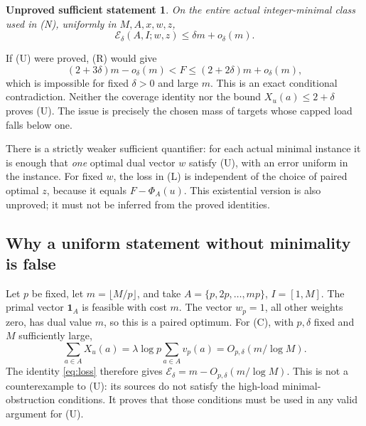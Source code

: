 \documentclass[11pt,a4paper]{article}
\newtheorem{claim}[theorem]{Unproved sufficient statement}
\newcommand{\Ph}{\Phi}
\newcommand{\ind}{\mathbf{1}}
\begin{document}
\begin{claim}\label{claim:cap}
On the entire actual integer-minimal class used in (N), uniformly in
\(M,A,x,w,z\),
\[
 \mathcal E_\delta(A,I;w,z)\le\delta m+o_\delta(m).
 \tag{U}
\]
\end{claim}
If (U) were proved, (R) would give
\[
 (2+3\delta)m-o_\delta(m)<F
 \le(2+2\delta)m+o_\delta(m),
\]
which is impossible for fixed \(\delta>0\) and large \(m\).
This is an exact conditional contradiction. Neither the coverage
identity nor the bound \(X_u(a)\le2+\delta\) proves (U).
The issue is precisely the chosen mass of targets whose capped load
falls below one.

There is a strictly weaker sufficient quantifier: for each actual
minimal instance it is enough that \emph{one} optimal dual vector \(w\)
satisfy (U), with an error uniform in the instance. For fixed \(w\),
the loss in (L) is independent of the choice of paired optimal \(z\),
because it equals \(F-\Ph_A(u)\). This existential version is also
unproved; it must not be inferred from the proved identities.

\subsection{Why a uniform statement without minimality is false}
Let \(p\) be fixed, let \(m=\lfloor M/p\rfloor\), and take
\(A=\{p,2p,\ldots,mp\}\), \(I=[1,M]\).
The primal vector \(\ind_A\) is feasible with cost \(m\).
The vector \(w_p=1\), all other weights zero, has dual value \(m\),
so this is a paired optimum. For (C), with \(p,\delta\) fixed and
\(M\) sufficiently large,
\[
 \sum_{a\in A}X_u(a)
 =\lambda\log p\sum_{a\in A}v_p(a)
 =O_{p,\delta}(m/\log M).
\]
The identity \eqref{eq:loss} therefore gives
\(\mathcal E_\delta=m-O_{p,\delta}(m/\log M)\).
This is not a counterexample to (U): its sources do not satisfy the
high-load minimal-obstruction conditions. It proves that those
conditions must be used in any valid argument for (U).
\end{document}
